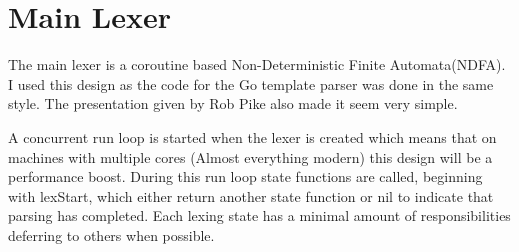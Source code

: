 \section{Main Lexer}
The main lexer is a coroutine based Non-Deterministic Finite Automata(NDFA).
I used this design as the code for the Go template parser was done in the same style.
The presentation given by Rob Pike\cite{PIKE-LEXING-VIDEO} also made it seem very simple.

A concurrent run loop is started when the lexer is created which means that on machines with multiple cores (Almost everything modern) this design will be a performance boost.
During this run loop state functions are called, beginning with lexStart, which either return another state function or nil to indicate that parsing has completed. 
Each lexing state has a minimal amount of responsibilities deferring to others when possible.


